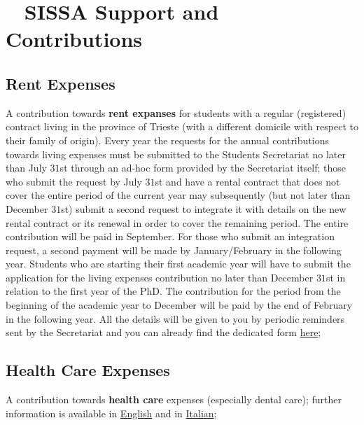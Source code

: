 \documentclass{sissavademecum}
\begin{document}
\chapter{\texorpdfstring{\faHandHoldingUsd\ }{} SISSA Support and Contributions}

\vspace{-0.4cm}


\section{Rent Expenses}

A contribution towards \textbf{rent expanses} for students with a regular (registered) contract living in the province of Trieste (with a different domicile with respect to their family of origin). Every year the requests for the annual contributions towards living expenses must be submitted to the Students Secretariat no later than July $31$st through an ad-hoc form provided by the Secretariat itself; those who submit the request by July $31$st and have a rental contract that does not cover the entire period of the current year may subsequently (but not later than December $31$st) submit a second request to integrate it with details on the new rental contract or its renewal in order to cover the remaining period. The entire contribution will be paid in September. For those who submit an integration request, a second payment will be made by January/February in the following year. Students who are starting their first academic year will have to submit the application for the living expenses contribution no later than December $31$st in relation to the first year of the PhD. The contribution for the period from the beginning of the academic year to December will be paid by the end of February in the following year. All the details will be given to you by periodic reminders sent by the Secretariat and you can already find the dedicated form \href{http://wiki.sissa.it/students/index.php/Contribution_towards_living_expenses}{here};
 

\section{Health Care Expenses}

A contribution towards \textbf{health care} expenses (especially dental care); further information is available in \href{https://www.sissa.it/_media/documenti/english_regolamento_interventi.pdf}{English} and in \href{https://www.sissa.it/_media/documenti/regolamento-assistenziale.pdf}{Italian};
\end{document}
